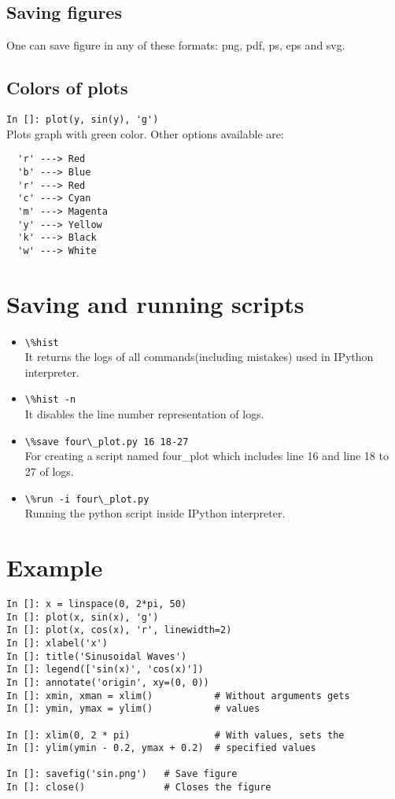 \documentclass[12pt]{article}
\newcommand{\typ}[1]{\lstinline{#1}}
\begin{document}
\subsection{Saving figures}
One can save figure in any of these formats: png, pdf, ps, eps and svg.

\subsection{Colors of plots}
\typ{In []: plot(y, sin(y), 'g')}\\
Plots graph with green color. Other options available are:
\begin{lstlisting}
  'r' ---> Red
  'b' ---> Blue
  'r' ---> Red 
  'c' ---> Cyan 
  'm' ---> Magenta
  'y' ---> Yellow
  'k' ---> Black 
  'w' ---> White
\end{lstlisting}

\section{Saving and running scripts}
\begin{itemize}
  \item \typ{\%hist}\\
  It returns the logs of all commands(including mistakes) used in IPython interpreter.
  \item \typ{\%hist -n}\\
It disables the line number representation of logs.
  \item \typ{\%save four\_plot.py 16 18-27}\\
For creating a script named four\_plot which includes line 16 and line 18 to 27 of logs.
  \item \typ{\%run -i four\_plot.py}\\
Running the python script inside IPython interpreter.
\end{itemize}

\section{Example}
  \begin{lstlisting}
In []: x = linspace(0, 2*pi, 50)
In []: plot(x, sin(x), 'g')
In []: plot(x, cos(x), 'r', linewidth=2)
In []: xlabel('x')
In []: title('Sinusoidal Waves')
In []: legend(['sin(x)', 'cos(x)'])
In []: annotate('origin', xy=(0, 0))
In []: xmin, xman = xlim()           # Without arguments gets
In []: ymin, ymax = ylim()           # values

In []: xlim(0, 2 * pi)               # With values, sets the
In []: ylim(ymin - 0.2, ymax + 0.2)  # specified values

In []: savefig('sin.png')   # Save figure
In []: close()              # Closes the figure
  \end{lstlisting}
\end{document}

